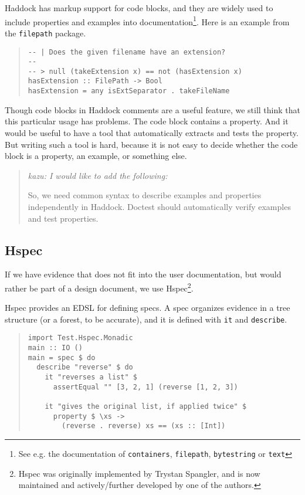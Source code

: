 \documentclass[preprint]{sigplanconf}
\begin{document}
Haddock has markup support for code blocks, and they are widely used
to include properties and examples into documentation\footnote{
See e.g. the documentation of
{\tt containers},
{\tt filepath},
{\tt bytestring} or
{\tt text}}.
Here is an example from the {\tt filepath} package.

\begin{quote}
\small
\begin{verbatim}
-- | Does the given filename have an extension?
--
-- > null (takeExtension x) == not (hasExtension x)
hasExtension :: FilePath -> Bool
hasExtension = any isExtSeparator . takeFileName
\end{verbatim}
\end{quote}

\noindent Though code blocks in Haddock comments are a useful feature,
we still think that this particular usage has problems.  The code
block contains a property.  And it would be useful to have a tool that
automatically extracts and tests the property.
But writing such a tool is hard, because it is not easy to decide
whether the code block is a property, an example, or something else.

\begin{quote}
    \emph{kazu: I would like to add the following:}

So, we need common syntax to describe examples and properties
independently in Haddock. Doctest should automatically verify
examples and test properties.
\end{quote}

\subsection{Hspec}

If we have evidence that does not fit into the user documentation, but
would rather be part of a design document, we use Hspec\footnote{%
Hspec was originally implemented by Trystan Spangler, and is now
maintained and actively/further developed by one of the authors.}.

Hspec provides an EDSL for defining specs.  A spec organizes evidence
in a tree structure (or a forest, to be accurate), and it is defined
with \texttt{it} and \texttt{describe}.

\begin{quote}
\small
\begin{verbatim}
import Test.Hspec.Monadic
main :: IO ()
main = spec $ do
  describe "reverse" $ do
    it "reverses a list" $
      assertEqual "" [3, 2, 1] (reverse [1, 2, 3])

    it "gives the original list, if applied twice" $
      property $ \xs ->
        (reverse . reverse) xs == (xs :: [Int])
\end{verbatim}
\end{quote}
\end{document}
